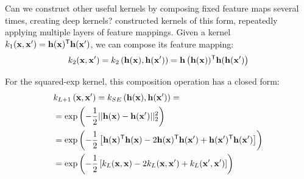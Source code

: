 \documentclass[twoside]{article}
\makeatletter
\newlength{\nonHumbleHeight}
\def\@humbleformat#1{{\settoheight{\nonHumbleHeight}{#1}\resizebox{!}{0.94\nonHumbleHeight}{#1}}}%
\newcommand\humble[1]{{\@humbleformat{#1}}}%
\newcommand{\MLP}{{\humble{MLP}}}
\newcommand{\hphi}{h}
\newcommand{\hPhi}{\vh}
\makeatother
\begin{document}
 
Can we construct other useful kernels by composing fixed feature maps several times, creating deep kernels?  \citet{cho2012kernel} constructed kernels of this form, repeatedly applying multiple layers of feature mappings.
Given a kernel $k_1(\vx, \vx') = \hPhi(\vx) \tra \hPhi(\vx')$, we can compose its feature mapping:
\begin{align}
k_2(\vx, \vx') 
 = k_2 \left(\hPhi(\vx), \hPhi(\vx') \right)
 = \hPhi \left( \hPhi(\vx)) \tra \hPhi(\hPhi(\vx') \right) \nonumber
\end{align}

For the squared-exp kernel, this composition operation has a closed form:%
%
\begin{align}
& k_{L+1} \left( \vx, \vx' \right) = k_{SE} \left( \hPhi(\vx), \hPhi(\vx') \right) =  \\
& = \exp \left( -\frac{1}{2} || \hPhi(\vx) - \hPhi(\vx')||_2^2 \right) \nonumber\\
& = \exp\left ( -\frac{1}{2} \left[ \hPhi(\vx) \tra \hPhi(\vx) - 2 \hPhi(\vx) \tra \hPhi(\vx') + \hPhi(\vx') \tra \hPhi(\vx') \right] \right) \nonumber \\
& = \exp \left( -\frac{1}{2} \left[ k_{L}(\vx, \vx) - 2 k_{L}(\vx, \vx') + k_{L}(\vx', \vx') \right] \right) \nonumber
\end{align}
%
\end{document}

